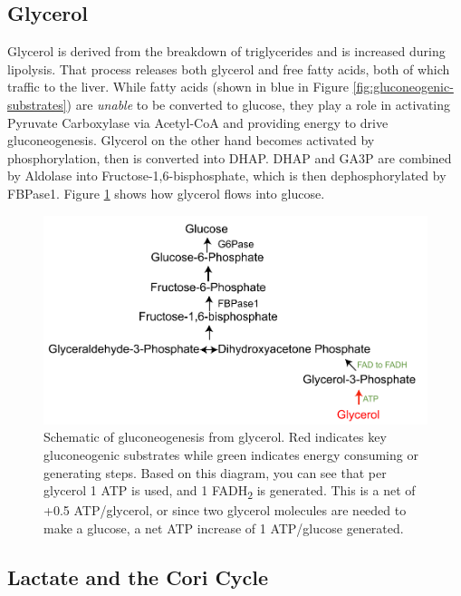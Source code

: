 \documentclass{tufte-handout}
\begin{document}
\subsection{Glycerol}

Glycerol is derived from the breakdown of triglycerides and is increased during lipolysis.  That process releases both glycerol and free fatty acids, both of which traffic to the liver.  While fatty acids (shown in blue in Figure \ref{fig:gluconeogenic-substrates}) are \emph{unable} to be converted to glucose, they play a role in activating Pyruvate Carboxylase via Acetyl-CoA and providing energy to drive gluconeogenesis.  Glycerol on the other hand becomes activated by phosphorylation, then is converted into DHAP.  DHAP and GA3P are combined by Aldolase into Fructose-1,6-bisphosphate, which is then dephosphorylated by FBPase1.  Figure \ref{fig:gluconeogenic-substrates-glycerol} shows how glycerol flows into glucose.

\begin{figure}
\includegraphics{figures/gluconeogenic-substrates-glycerol.pdf}
\caption{Schematic of gluconeogenesis from glycerol.  Red indicates key gluconeogenic substrates while green indicates energy consuming or generating steps.  Based on this diagram, you can see that per glycerol 1 ATP is used, and 1 FADH\textsubscript{2} is generated.  This is a net of +0.5 ATP/glycerol, or since two glycerol molecules are needed to make a glucose, a net ATP increase of 1 ATP/glucose generated.}
\label{fig:gluconeogenic-substrates-glycerol}
\end{figure}

\subsection{Lactate and the Cori Cycle}
\end{document}
